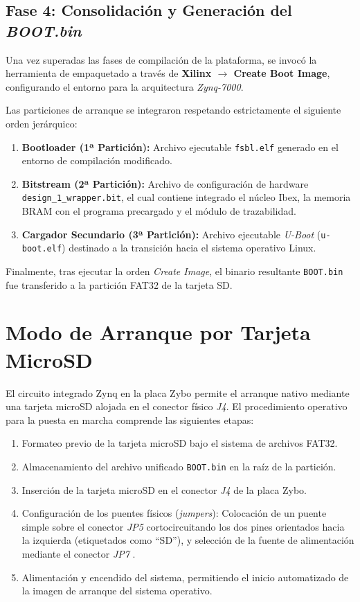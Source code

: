 \subsection{Fase 4: Consolidación y Generación del \textit{BOOT.bin}}
Una vez superadas las fases de compilación de la plataforma, se invocó la herramienta de empaquetado a través de \textbf{Xilinx $\rightarrow$ Create Boot Image}, configurando el entorno para la arquitectura \textit{Zynq-7000}. 

Las particiones de arranque se integraron respetando estrictamente el siguiente orden jerárquico:
\begin{enumerate}
    \item \textbf{Bootloader (1ª Partición):} Archivo ejecutable \texttt{fsbl.elf} generado en el entorno de compilación modificado.
    \item \textbf{Bitstream (2ª Partición):} Archivo de configuración de hardware \texttt{design\_1\_wrapper.bit}, el cual contiene integrado el núcleo Ibex, la memoria BRAM con el programa precargado y el módulo de trazabilidad.
    \item \textbf{Cargador Secundario (3ª Partición):} Archivo ejecutable \textit{U-Boot} (\texttt{u-boot.elf}) destinado a la transición hacia el sistema operativo Linux.
\end{enumerate}

Finalmente, tras ejecutar la orden \textit{Create Image}, el binario resultante \texttt{BOOT.bin} fue transferido a la partición FAT32 de la tarjeta SD.

\section{Modo de Arranque por Tarjeta MicroSD}
El circuito integrado Zynq en la placa Zybo permite el arranque nativo mediante una tarjeta microSD alojada en el conector físico \textit{J4}. El procedimiento operativo para la puesta en marcha comprende las siguientes etapas:

\begin{enumerate}
    \item Formateo previo de la tarjeta microSD bajo el sistema de archivos FAT32.\\
    \item Almacenamiento del archivo unificado \texttt{BOOT.bin} en la raíz de la partición.\\
    \item Inserción de la tarjeta microSD en el conector \textit{J4} de la placa Zybo.\\
    \item Configuración de los puentes físicos (\textit{jumpers}): Colocación de un puente simple sobre el conector \textit{JP5} cortocircuitando los dos pines orientados hacia la izquierda (etiquetados como ``SD''), y selección de la fuente de alimentación mediante el conector \textit{JP7} \cite{digilent_zybo_reference_manual}.\\
    \item Alimentación y encendido del sistema, permitiendo el inicio automatizado de la imagen de arranque del sistema operativo.
\end{enumerate}